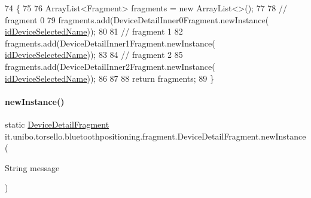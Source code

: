 \begin{DoxyCode}
74                                                \{
75 
76         ArrayList<Fragment> fragments = \textcolor{keyword}{new} ArrayList<>();
77 
78         \textcolor{comment}{// fragment 0}
79         fragments.add(DeviceDetailInner0Fragment.newInstance(
      \hyperlink{classit_1_1unibo_1_1torsello_1_1bluetoothpositioning_1_1fragment_1_1DeviceDetailFragment_a6d52d8371a07fb8da75879758d1d6942_a6d52d8371a07fb8da75879758d1d6942}{idDeviceSelectedName}));
80 
81         \textcolor{comment}{// fragment 1}
82         fragments.add(DeviceDetailInner1Fragment.newInstance(
      \hyperlink{classit_1_1unibo_1_1torsello_1_1bluetoothpositioning_1_1fragment_1_1DeviceDetailFragment_a6d52d8371a07fb8da75879758d1d6942_a6d52d8371a07fb8da75879758d1d6942}{idDeviceSelectedName}));
83 
84         \textcolor{comment}{// fragment 2}
85         fragments.add(DeviceDetailInner2Fragment.newInstance(
      \hyperlink{classit_1_1unibo_1_1torsello_1_1bluetoothpositioning_1_1fragment_1_1DeviceDetailFragment_a6d52d8371a07fb8da75879758d1d6942_a6d52d8371a07fb8da75879758d1d6942}{idDeviceSelectedName}));
86 
87 
88         \textcolor{keywordflow}{return} fragments;
89     \}
\end{DoxyCode}
\hypertarget{classit_1_1unibo_1_1torsello_1_1bluetoothpositioning_1_1fragment_1_1DeviceDetailFragment_a626de18d36d44ae0b4ff21c2527bdf5a_a626de18d36d44ae0b4ff21c2527bdf5a}{}\label{classit_1_1unibo_1_1torsello_1_1bluetoothpositioning_1_1fragment_1_1DeviceDetailFragment_a626de18d36d44ae0b4ff21c2527bdf5a_a626de18d36d44ae0b4ff21c2527bdf5a} 
\paragraph{\texorpdfstring{new\+Instance()}{newInstance()}}
{\footnotesize\ttfamily static \hyperlink{classit_1_1unibo_1_1torsello_1_1bluetoothpositioning_1_1fragment_1_1DeviceDetailFragment}{Device\+Detail\+Fragment} it.\+unibo.\+torsello.\+bluetoothpositioning.\+fragment.\+Device\+Detail\+Fragment.\+new\+Instance (\begin{DoxyParamCaption}\item[{String}]{message }\end{DoxyParamCaption})\hspace{0.3cm}{\ttfamily [static]}}


